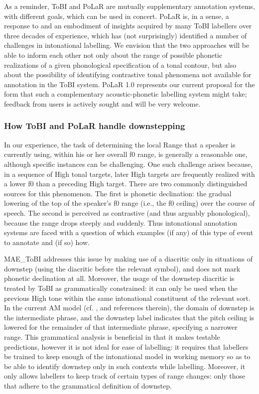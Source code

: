 \documentclass[11pt, twoside]{memoir}
\def\polar#1{{\relsize{-.5}\fontspec[Mapping=tex-text]{Roboto Mono}{#1}}}
\def\tobi#1{\polar{#1}}
\begin{document}
As a reminder, ToBI and PoLaR are mutually supplementary annotation systems, with different goals, which can be used in concert.  PoLaR is, in a sense, a response to and an embodiment of insights acquired by many ToBI labellers over three decades of experience, which has (not surprisingly) identified a number of challenges in intonational labelling. We envision that the two approaches will be able to inform each other not only about the range of possible phonetic realizations of a given phonological specification of a tonal contour, but also about the possibility of identifying contrastive tonal phenomena not available for annotation in the ToBI system. PoLaR 1.0 represents our current proposal for the form that such a complementary acoustic-phonetic labelling system might take; feedback from users is actively sought and will be very welcome.

\subsubsection{How ToBI and PoLaR handle downstepping}\label{sec:downstepping-am-models-and-tobi-annotation}
In our experience, the task of determining the local Range that a speaker is currently using, within his or her overall f0 range, is generally a reasonable one, although specific instances can be challenging. One such challenge arises because, in a sequence of High tonal targets, later High targets are frequently realized with a lower f0 than a preceding High target. There are two commonly distinguished sources for this phenomenon. The first is phonetic declination: the gradual lowering of the top of the speaker’s f0 range (i.e., the f0 ceiling) over the course of speech. The second is perceived as contrastive (and thus arguably phonological), because the range drops steeply and suddenly. Thus intonational annotation systems are faced with a question of which examples (if any) of this type of event to annotate and (if so) how.

MAE\_ToBI addresses this issue by making use of a diacritic only in situations of downstep (using the \tobi{!} diacritic before the relevant \tobi{H} symbol), and does not mark phonetic declination at all. Moreover, the usage of the downstep diacritic is treated by ToBI as grammatically constrained: it can only be used when the previous High tone within the same intonational constituent of the relevant sort. In the current AM model (cf. \citealt[17–18]{beckman-05}, and references therein), the domain of downstep is the intermediate phrase, and the downstep label indicates that the pitch ceiling is lowered for the remainder of that intermediate phrase, specifying a narrower range. This grammatical analysis is beneficial in that it makes testable predictions, however it is not ideal for ease of labelling: it requires that labellers be trained to keep enough of the intonational model in working memory so as to be able to identify downstep only in such contexts while labelling. Moreover, it only allows labellers to keep track of certain types of range changes: only those that adhere to the grammatical definition of downstep.
\end{document}
